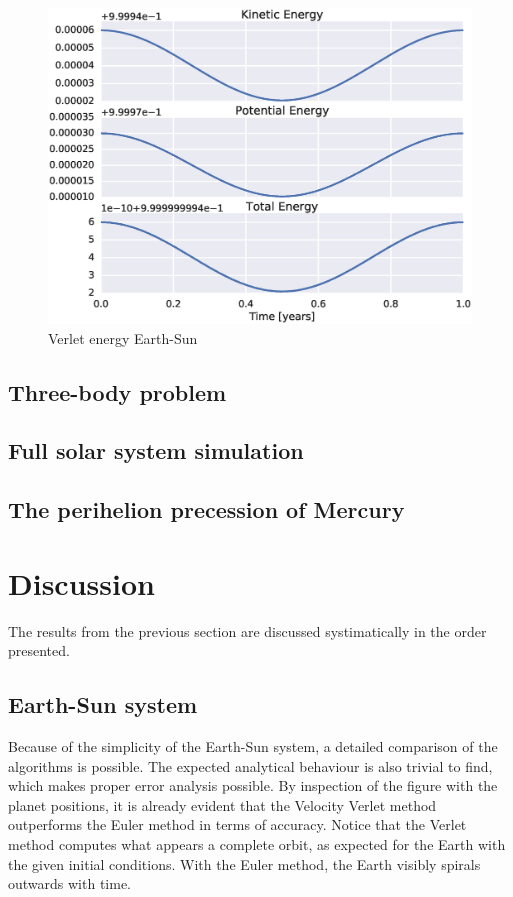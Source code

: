 \documentclass[aps,reprint]{revtex4-1}
\begin{document}
\begin{figure}[H]
  \includegraphics[width=\columnwidth]{figures/energy_verlet.eps}
  \caption{Verlet energy Earth-Sun}
  \label{fig:verletenergy}
\end{figure}

\subsection{Three-body problem}
\subsection{Full solar system simulation}
\subsection{The perihelion precession of Mercury}

\section{Discussion}
\label{sec:discussion}
The results from the previous section are discussed systimatically in the order
presented.
\subsection{Earth-Sun system}
Because of the simplicity of the Earth-Sun system, a detailed comparison of the
algorithms is possible. The expected analytical behaviour is also trivial to
find, which makes proper error analysis possible. By inspection of the figure with the
planet positions, it is already evident that the Velocity Verlet method outperforms
the Euler method in terms of accuracy. Notice that the Verlet method computes what
appears a complete orbit, as expected for the Earth with the given initial conditions.
With the Euler method, the Earth visibly spirals outwards with time.
\end{document}
